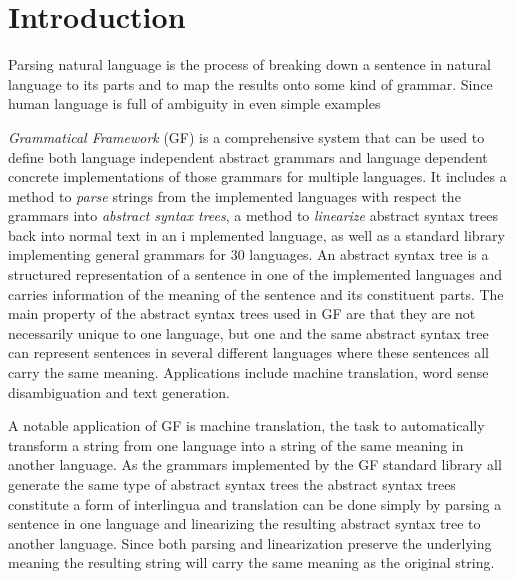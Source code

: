 \chapter{Introduction}

Parsing natural language is the process of breaking down a sentence in natural language to its parts and to map the results onto some kind of grammar. Since human language is full of ambiguity in even simple examples





\emph{Grammatical Framework} (GF) is a comprehensive system that can be used to define both language independent abstract grammars and language dependent concrete implementations of those grammars for multiple languages. It includes a method to \emph{parse} strings from the implemented languages with respect the grammars into \emph{abstract syntax trees}, a method to \emph{linearize} abstract syntax trees back into normal text in an i mplemented language, as well as a standard library implementing general grammars for 30 languages. An abstract syntax tree is a structured representation of a sentence in one of the implemented languages and carries information of the meaning of the sentence and its constituent parts. The main property of the abstract syntax trees used in GF are that they are not necessarily unique to one language, but one and the same abstract syntax tree can represent sentences in several different languages where these sentences all carry the same meaning. Applications include machine translation, word sense disambiguation and text generation.

A notable application of GF is machine translation, the task to automatically transform a string from one language into a string of the same meaning in another language. As the grammars implemented by the GF standard library all generate the same type of abstract syntax trees the abstract syntax trees constitute a form of interlingua and translation can be done simply by parsing a sentence in one language and linearizing the resulting abstract syntax tree to another language. Since both parsing and linearization preserve the underlying meaning the resulting string will carry the same meaning as the original string. 


